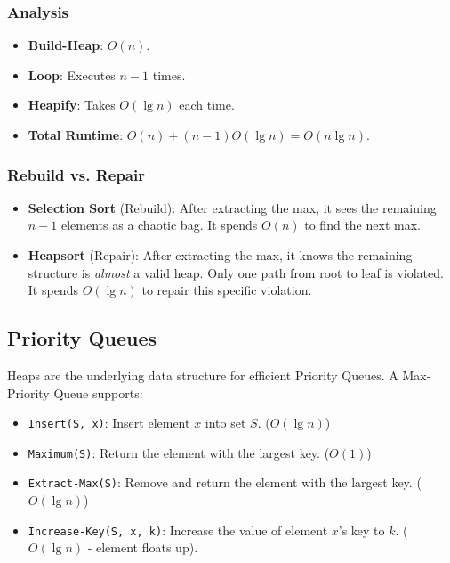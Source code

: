 \documentclass[12pt]{article}
\theoremstyle{blueplain}
\theoremstyle{bluedef}
\theoremstyle{blueremark}
\begin{document}
\subsubsection{Analysis}
\begin{itemize}
    \item \textbf{Build-Heap}: $O(n)$.
    \item \textbf{Loop}: Executes $n-1$ times.
    \item \textbf{Heapify}: Takes $O(\lg n)$ each time.
    \item \textbf{Total Runtime}: $O(n) + (n-1) O(\lg n) = O(n \lg n)$.
\end{itemize}

\subsubsection{Rebuild vs. Repair}
\begin{itemize}
    \item \textbf{Selection Sort} (Rebuild): After extracting the max, it sees the remaining $n-1$ elements as a chaotic bag. It spends $O(n)$ to find the next max.
    \item \textbf{Heapsort} (Repair): After extracting the max, it knows the remaining structure is \textit{almost} a valid heap. Only one path from root to leaf is violated. It spends $O(\lg n)$ to repair this specific violation.
\end{itemize}

\subsection{Priority Queues}

Heaps are the underlying data structure for efficient Priority Queues. A Max-Priority Queue supports:
\begin{itemize}
    \item \texttt{Insert(S, x)}: Insert element $x$ into set $S$. ($O(\lg n)$)
    \item \texttt{Maximum(S)}: Return the element with the largest key. ($O(1)$)
    \item \texttt{Extract-Max(S)}: Remove and return the element with the largest key. ($O(\lg n)$)
    \item \texttt{Increase-Key(S, x, k)}: Increase the value of element $x$'s key to $k$. ($O(\lg n)$ - element floats up).
\end{itemize}
\end{document}
